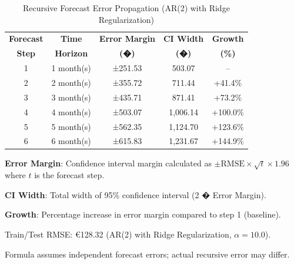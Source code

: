 \begin{table}[htbp]
\centering
\caption{Recursive Forecast Error Propagation (AR(2) with Ridge Regularization)}
\label{tab:forecast_error_propagation}
\begin{tabular}{ccccc}
\toprule
\textbf{Forecast} & \textbf{Time} & \textbf{Error Margin} & \textbf{CI Width} & \textbf{Growth} \\
\textbf{Step} & \textbf{Horizon} & \textbf{(�)} & \textbf{(�)} & \textbf{(\%)} \\
\midrule
    1 & 1 month(s) & ±251.53 & 503.07 & – \\
    2 & 2 month(s) & ±355.72 & 711.44 & +41.4\% \\
    3 & 3 month(s) & ±435.71 & 871.41 & +73.2\% \\
    4 & 4 month(s) & ±503.07 & 1,006.14 & +100.0\% \\
    5 & 5 month(s) & ±562.35 & 1,124.70 & +123.6\% \\
    6 & 6 month(s) & ±615.83 & 1,231.67 & +144.9\% \\
\bottomrule
\end{tabular}
\begin{tablenotes}
    \small
    \item \textbf{Error Margin}: Confidence interval margin calculated as $\pm\text{RMSE} \times \sqrt{t} \times 1.96$ where $t$ is the forecast step.
    \item \textbf{CI Width}: Total width of 95\% confidence interval (2 � Error Margin).
    \item \textbf{Growth}: Percentage increase in error margin compared to step 1 (baseline).
    \item Train/Test RMSE: €128.32 (AR(2) with Ridge Regularization, $\alpha=10.0$).
    \item Formula assumes independent forecast errors; actual recursive error may differ.
\end{tablenotes}
\end{table}

